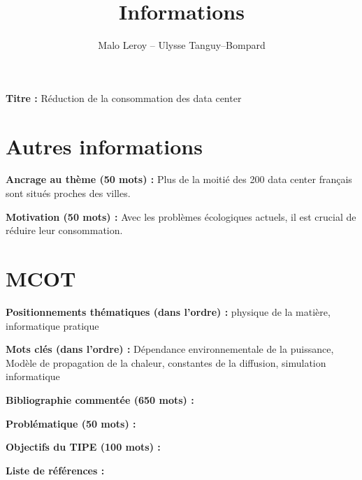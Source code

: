 \documentclass[french]{article}
\author{Malo Leroy -- Ulysse Tanguy--Bompard}
\title{Informations}
\begin{document}
\maketitle

\textbf{Titre :} Réduction de la consommation des data center

\section{Autres informations}

\textbf{Ancrage au thème (50 mots) :} Plus de la moitié des 200 data center français sont situés proches des villes.

\textbf{Motivation (50 mots) :} Avec les problèmes écologiques actuels, il est crucial de réduire leur consommation.

\section{MCOT}

\textbf{Positionnements thématiques (dans l'ordre) :} physique de la matière, informatique pratique

\textbf{Mots clés (dans l'ordre) :} Dépendance environnementale de la puissance, Modèle de propagation de la chaleur, constantes de la diffusion, simulation informatique

\textbf{Bibliographie commentée (650 mots) :}

\textbf{Problématique (50 mots) :}

\textbf{Objectifs du TIPE (100 mots) :}

\textbf{Liste de références :}

\end{document}
